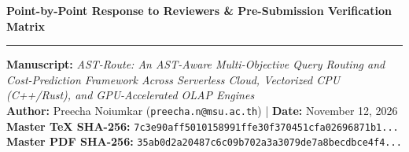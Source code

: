 \documentclass[10pt,a4paper]{article}
\begin{document}
{\Large\textbf{Point-by-Point Response to Reviewers \& Pre-Submission Verification Matrix}}
\vspace{3pt}
\hrule
\vspace{6pt}

\textbf{Manuscript:} \textit{AST-Route: An AST-Aware Multi-Objective Query Routing and Cost-Prediction Framework Across Serverless Cloud, Vectorized CPU (C++/Rust), and GPU-Accelerated OLAP Engines}\\
\textbf{Author:} Preecha Noiumkar (\texttt{preecha.n@msu.ac.th}) \quad | \quad \textbf{Date:} November 12, 2026\\
\textbf{Master TeX SHA-256:} \texttt{7c3e90aff5010158991ffe30f370451cfa02696871b1...}\\
\textbf{Master PDF SHA-256:} \texttt{35ab0d2a20487c6c09b702a3a3079de7a8becdbce4f4...}
\end{document}
